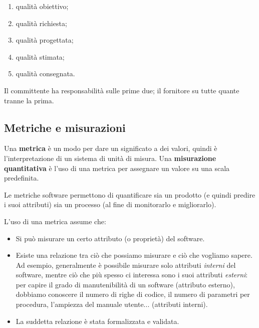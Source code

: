 \documentclass[a4paper]{article}
\begin{document}
	\begin{enumerate}
		
			
	\item qualità obiettivo;
			
	\item qualità richiesta;
			
	\item qualità progettata;
			
	\item qualità stimata;
			
	\item qualità consegnata.
		
	\end{enumerate}

		
Il committente ha responsabilità sulle prime due; il fornitore su tutte quante tranne la prima.

		
	\subsection{Metriche e misurazioni}

		
Una \textbf{metrica} è un modo per dare un significato a dei valori, quindi è l'interpretazione di un sistema di unità di misura. Una \textbf{misurazione quantitativa} è l'uso di una metrica per assegnare un valore su una scala predefinita.
		
Le metriche software permettono di quantificare sia un prodotto (e quindi predire i suoi attributi) sia un processo (al fine di monitorarlo e migliorarlo).
		
L'uso di una metrica assume che:
		
	\begin{itemize}
		
			
	\item Si può misurare un certo attributo (o proprietà) del software.
			
	\item Esiste una relazione tra ciò che possiamo misurare e ciò che vogliamo sapere. Ad esempio, generalmente è possibile misurare solo attributi \emph{interni} del software, mentre ciò che più spesso ci interessa sono i suoi attributi \emph{esterni}: per capire il grado di manutenibilità di un software (attributo esterno), dobbiamo conoscere il numero di righe di codice, il numero di parametri per procedura, l'ampiezza del manuale utente... (attributi interni).
			
	\item La suddetta relazione è stata formalizzata e validata.
		
	\end{itemize}
\end{document}

